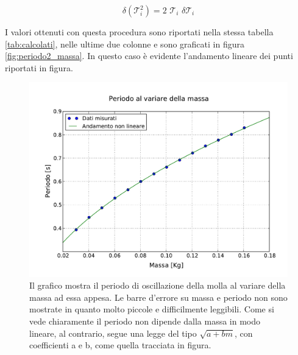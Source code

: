 \begin{equation*}
    \delta(\mathcal{T}_i^2) = 2 \,\, \mathcal{T}_i \,\, \delta \mathcal{T}_i
\end{equation*}

I valori ottenuti con questa procedura sono riportati nella stessa tabella \ref{tab:calcolati}, nelle ultime due colonne e sono
graficati in figura \ref{fig:periodo2_massa}. In questo caso è evidente l'andamento lineare dei punti riportati in figura.

\begin{figure}
    \centering
    \includegraphics[width=120mm]{immagini/periodo_massa.pdf}
    \caption{Il grafico mostra il periodo di oscillazione della molla al variare della massa ad essa appesa.
        Le barre d'errore su massa e periodo non sono mostrate in quanto molto piccole e difficilmente leggibili.
        Come si vede chiaramente il periodo non dipende dalla massa in modo lineare, al contrario, segue una legge del tipo
        $\sqrt{a + bm}$, con coefficienti a e b, come quella tracciata in figura.}
    \label{fig:periodo_massa}
\end{figure}

